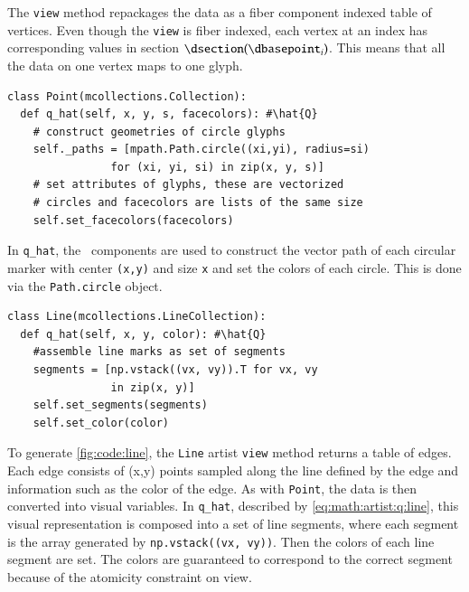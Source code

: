 \documentclass[journal]{vgtc}                %
\begin{document}
The \texttt{view} method repackages the data as a fiber component indexed table of vertices. Even though the \texttt{view} is fiber indexed, each vertex at an index \dbasepoint has corresponding values in section $\dsection(\dbasepoint_{i})$. This means that all the data on one vertex maps to one glyph.
\begin{verbatim}
class Point(mcollections.Collection):
  def q_hat(self, x, y, s, facecolors): #\hat{Q}
    # construct geometries of circle glyphs
    self._paths = [mpath.Path.circle((xi,yi), radius=si) 
                for (xi, yi, si) in zip(x, y, s)] 
    # set attributes of glyphs, these are vectorized 
    # circles and facecolors are lists of the same size
    self.set_facecolors(facecolors)
\end{verbatim} 
In \texttt{q_hat}, the \vsection\ components are used to construct the vector path of each circular marker with center \texttt{(x,y)} and size \texttt{x} and set the colors of each circle. This is done via the \texttt{Path.circle} object. 
\begin{verbatim}
class Line(mcollections.LineCollection):
  def q_hat(self, x, y, color): #\hat{Q}
    #assemble line marks as set of segments 
    segments = [np.vstack((vx, vy)).T for vx, vy 
                in zip(x, y)]
    self.set_segments(segments)
    self.set_color(color)
\end{verbatim}
To generate \autoref{fig:code:line}, the \texttt{Line} artist \texttt{view} method returns a table of edges. Each edge consists of (x,y) points sampled along the line defined by the edge and information such as the color of the edge. As with \texttt{Point}, the data is then converted into visual variables. In \texttt{q_hat}, described by \autoref{eq:math:artist:q:line}, this visual representation is composed into a set of line segments, where each segment is the array generated by \texttt{np.vstack((vx, vy))}. Then the colors of each line segment are set. The colors are guaranteed to correspond to the correct segment because of the atomicity constraint on view. 
\end{document}
